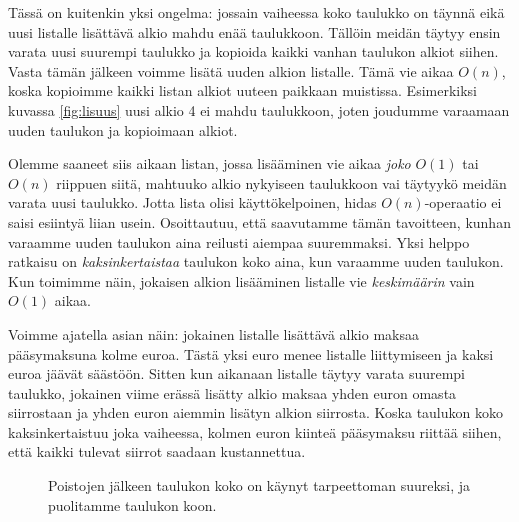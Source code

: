 Tässä on kuitenkin yksi ongelma: jossain vaiheessa koko taulukko
on täynnä eikä uusi listalle lisättävä alkio mahdu enää taulukkoon.
Tällöin meidän täytyy ensin varata uusi suurempi taulukko ja
kopioida kaikki vanhan taulukon alkiot siihen.
Vasta tämän jälkeen voimme lisätä uuden alkion listalle.
Tämä vie aikaa $O(n)$, koska kopioimme kaikki listan alkiot
uuteen paikkaan muistissa.
Esimerkiksi kuvassa \ref{fig:lisuus} uusi alkio 4 ei mahdu taulukkoon,
joten joudumme varaamaan uuden taulukon ja kopioimaan alkiot.

Olemme saaneet siis aikaan listan, jossa lisääminen
vie aikaa \emph{joko} $O(1)$ tai $O(n)$ riippuen siitä,
mahtuuko alkio nykyiseen taulukkoon vai täytyykö
meidän varata uusi taulukko.
Jotta lista olisi käyttökelpoinen, hidas $O(n)$-operaatio
ei saisi esiintyä liian usein.
Osoittautuu, että saavutamme tämän tavoitteen,
kunhan varaamme uuden taulukon aina reilusti aiempaa suuremmaksi.
Yksi helppo ratkaisu on \emph{kaksinkertaistaa} taulukon koko aina,
kun varaamme uuden taulukon.
Kun toimimme näin, jokaisen alkion lisääminen listalle vie
\emph{keskimäärin} vain $O(1)$ aikaa.

Voimme ajatella asian näin: jokainen listalle lisättävä alkio
maksaa pääsy\-maksuna kolme euroa.
Tästä yksi euro menee listalle liittymiseen ja kaksi euroa jäävät säästöön.
Sitten kun aikanaan listalle täytyy varata suurempi taulukko,
jokainen viime erässä lisätty alkio maksaa yhden euron omasta siirrostaan
ja yhden euron aiemmin lisätyn alkion siirrosta.
Koska taulukon koko kaksinkertaistuu joka vaiheessa,
kolmen euron kiinteä pääsymaksu riittää siihen, että kaikki tulevat
siirrot saadaan kustannettua.

\begin{figure}
\center
{}
\caption{Poistojen jälkeen taulukon koko on käynyt tarpeettoman suureksi,
ja puolitamme taulukon koon.}                                                                        
\label{fig:lispoi}
\end{figure}

